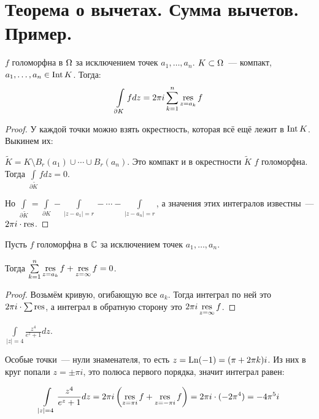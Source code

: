 \section{Теорема о вычетах. Сумма вычетов. Пример.}

\begin{theorem}

    $f$ голоморфна в $\Omega$ за исключением точек
    $a_1, \ldots, a_n$.
    $K \subset \Omega$~--- компакт,
    $a_1, \ldots, a_n \in \operatorname{Int} K$.
    Тогда: 
    \begin{gather*}
        \int\limits_{\partial K} fdz =
        2\pi i \sum\limits_{k=1}^n \operatorname*{res}\limits_{z = a_k} f
    \end{gather*}
\end{theorem}

\begin{proof}
    У каждой точки можно взять окрестность,
    которая всё ещё лежит в $\operatorname{Int} K$. Выкинем их:

    $\widetilde{K} = K \setminus B_r(a_1) \cup \cdots \cup B_r(a_n)$.
    Это компакт и в окрестности $\widetilde{K}$ $f$ голоморфна.
    Тогда $\int\limits_{\partial \widetilde K} fdz = 0$.

    Но $\int\limits_{\partial \widetilde K} = \int\limits_{\partial K}
        - \int\limits_{|z-a_1|=r} - \cdots - \int\limits_{|z-a_n|=r}$,
    а значения этих интегралов известны~--- $2\pi i \cdot \operatorname*{res}$.
\end{proof}

\begin{consequence}
    Пусть $f$ голоморфна в $\mathbb{C}$ за исключением точек
    $a_1, \ldots, a_n$.

    Тогда
    $\sum\limits_{k=1}^{n} \operatorname*{res}\limits_{z=a_k} f + \operatorname*{res}\limits_{z=\infty} f = 0$.
\end{consequence}

\begin{proof}
    Возьмём кривую, огибающую все $a_k$.
    Тогда интеграл по ней это $2\pi i \cdot \sum \operatorname*{res}$,
    а интеграл в обратную сторону это $2\pi i \operatorname*{res}\limits_{z=\infty} f$.
\end{proof}

\begin{example}
    $\int\limits_{|z|=4} \frac{z^4}{e^z+1}dz$.

    Особые точки~--- нули знаменателя, то есть
    $z = \operatorname{Ln}(-1) = (\pi + 2\pi k)i$.
    Из них в круг попали $z = \pm \pi i$,
    это полюса первого порядка,
    значит интеграл равен:

    \[
        \int\limits_{|z|=4} \frac{z^4}{e^z+1}dz
        = 2\pi i \left(\operatorname*{res}\limits_{z=\pi i} f + \operatorname*{res}\limits_{z=-\pi i} f\right)
        = 2\pi i \cdot (-2\pi^4) = -4\pi^5i
    \]
\end{example}

\newpage

